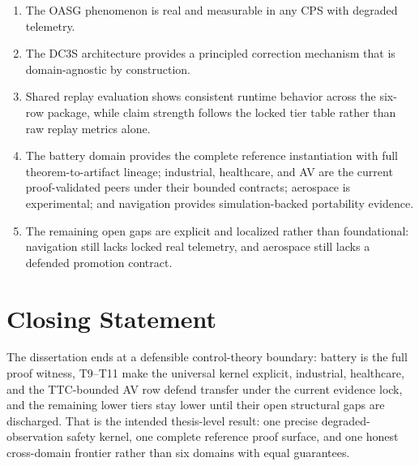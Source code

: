 \begin{enumerate}
  \item The OASG phenomenon is real and measurable in any CPS with
    degraded telemetry.
  \item The DC3S architecture provides a principled correction mechanism
    that is domain-agnostic by construction.
  \item Shared replay evaluation shows consistent runtime behavior across
    the six-row package, while claim strength follows the locked tier table
    rather than raw replay metrics alone.
  \item The battery domain provides the complete reference instantiation
    with full theorem-to-artifact lineage; industrial, healthcare, and AV
    are the current proof-validated peers under their bounded contracts;
    aerospace is experimental; and navigation provides simulation-backed
    portability evidence.
  \item The remaining open gaps are explicit and localized rather than
    foundational: navigation still lacks locked real telemetry, and
    aerospace still lacks a defended promotion contract.
\end{enumerate}

\section{Closing Statement}

The dissertation ends at a defensible control-theory boundary: battery is the
full proof witness, T9--T11 make the universal kernel explicit, industrial,
healthcare, and the TTC-bounded AV row defend transfer under the current
evidence lock, and the remaining lower tiers stay lower until their open
structural gaps are discharged.  That is the intended thesis-level result:
one precise degraded-observation safety kernel, one complete reference proof
surface, and one honest cross-domain frontier rather than six domains with
equal guarantees.
